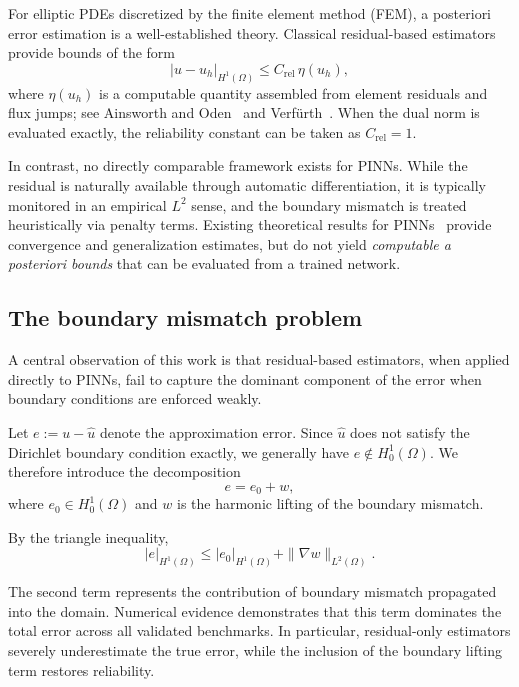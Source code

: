 For elliptic PDEs discretized by the finite element method (FEM), a posteriori
error estimation is a well-established theory. Classical residual-based
estimators provide bounds of the form
\begin{equation}\label{eq:classical-aposteriori}
|u - u_h|_{H^1(\Omega)} \leq C_{\mathrm{rel}}\, \eta(u_h),
\end{equation}
where $\eta(u_h)$ is a computable quantity assembled from element residuals
and flux jumps; see Ainsworth and Oden~\cite{ainsworth1997posteriori} and
Verf\"urth~\cite{verfurth2013posteriori}. When the dual norm is evaluated
exactly, the reliability constant can be taken as $C_{\mathrm{rel}} = 1$.

In contrast, no directly comparable framework exists for PINNs. While the
residual is naturally available through automatic differentiation, it is
typically monitored in an empirical $L^2$ sense, and the boundary mismatch is
treated heuristically via penalty terms. Existing theoretical results for
PINNs~\cite{mishra2022estimates, deryck2022generic, shin2020convergence}
provide convergence and generalization estimates, but do not yield
\emph{computable a posteriori bounds} that can be evaluated from a trained
network.

\subsection{The boundary mismatch problem}

A central observation of this work is that residual-based estimators,
when applied directly to PINNs, fail to capture the dominant component of
the error when boundary conditions are enforced weakly.

Let $e := u - \hat{u}$ denote the approximation error. Since $\hat{u}$ does not
satisfy the Dirichlet boundary condition exactly, we generally have
$e \notin H^1_0(\Omega)$. We therefore introduce the decomposition
\[
e = e_0 + w,
\]
where $e_0 \in H^1_0(\Omega)$ and $w$ is the harmonic lifting of the boundary
mismatch.

By the triangle inequality,
\[
|e|_{H^1(\Omega)} \leq |e_0|_{H^1(\Omega)} + \|\nabla w\|_{L^2(\Omega)}.
\]

The second term represents the contribution of boundary mismatch propagated
into the domain. Numerical evidence demonstrates that this term dominates the
total error across all validated benchmarks. In particular, residual-only
estimators severely underestimate the true error, while the inclusion of the
boundary lifting term restores reliability.

